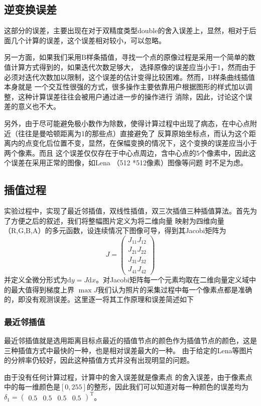 \documentclass[UTF8,a4paper]{paper}
\begin{document}
\subsection{逆变换误差}
这部分的误差，主要出现在对于双精度类型double的舍入误差上，显然，相对于后面几个计算的误差，这个误差相对较小，可以忽略。

另一方面，如果我们采用B样条插值，寻找一个点的原像过程是采用一个简单的数值计算方式得到的，如果迭代次数足够大，
选择原像的误差应当小于1，然而由于必须对迭代次数加以限制，这个误差的估计变得比较困难。然而，B样条曲线插值本身就是
一个交互性很强的方式，很多操作主要依靠用户根据图形的样式加以调整，这种计算误差往往会被用户通过进一步的操作进行
消除，因此，讨论这个误差的意义也不大。

另外，由于尽可能避免极小数作为除数，使得计算过程中出现了病态，在中心点附近（往往是曼哈顿距离为1的那些点）直接避免了
反算原始坐标点，而认为这个距离内的点变化后位置不变，显然，在保幅变换的情况下，这个变换的误差应当小于两个像素。而且
这个误差仅仅存在于中心点周边，含中心点的5个像素中，因此这个误差在采用正常的图像，如Lena （512 *512像素）图像等问题
时不足为虑。
\subsection{插值过程}
实验过程中，实现了最近邻插值，双线性插值，双三次插值三种插值算法。首先为了方便之后的叙述，我们将整幅图片定义为将二维向量
映射为四维向量（R,G,B,A）的多元函数，设连续情况下图像可导，得到其Jacobi矩阵为
$$J = \begin{pmatrix}J_{11} J_{12}\\ J_{21} J_{22}\\ J_{31} J_{32}\\ J_{41} J_{42}\end{pmatrix}$$ 
并定义全微分形式为$\mathrm{d} y = J\mathrm{d} x$。对Jacobi矩阵每一个元素均取在二维向量定义域中的最大值得到梯度上界
$\max J$我们认为照片的采集过程中每一个像素点都是准确的，即没有观测误差。这里逐一将其工作原理和误差简述如下
\subsubsection{最近邻插值}
最近邻插值就是选用距离目标点最近的插值节点的颜色作为插值节点的颜色，这是三种插值方式中最快的一种，也是相对误差最大的一种。
由于给定的Lena等图片的分辨率仍较好，因此这种插值方式并没有出现明显的问题。

由于没有任何计算过程，计算中的舍入误差就是像素点
的舍入误差，由于像素点中的每一维颜色是$[0,255]$的整形，因此我们可以知道对每一种颜色的误差均为
$\delta_1 = \begin{pmatrix}0.5 & 0.5 & 0.5 & 0.5 \end{pmatrix}^\mathrm{T}$。
\end{document}
